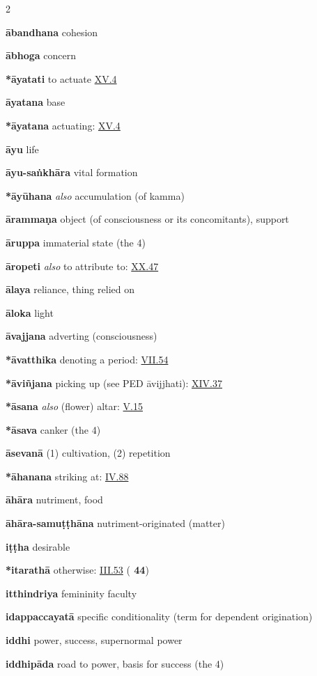 \begin{multicols}{2}
\begin{vismHanging}
\par\textbf{ābandhana} cohesion 
\par\textbf{ābhoga} concern
\par\textbf{*āyatati} to actuate \hyperlink{XV.4}{XV.4}{}
\par\textbf{āyatana} base
\par\textbf{*āyatana} actuating: \hyperlink{XV.4}{XV.4}{}
\par\textbf{āyu} life 
\par\textbf{āyu-saṅkhāra} vital formation 
\par\textbf{*āyūhana} \emph{also }accumulation (of kamma)
\par\textbf{ārammaṇa} object (of consciousness or its concomitants), support
\par\textbf{āruppa} immaterial state (the 4)
\par\textbf{āropeti} \emph{also }to attribute to: \hyperlink{XX.47}{XX.47}{}
\par\textbf{ālaya} reliance, thing relied on
\par\textbf{āloka} light 
\par\textbf{āvajjana} adverting (consciousness) 
\par\textbf{*āvatthika} denoting a period: \hyperlink{VII.54}{VII.54}{}
\par\textbf{*āviñjana} picking up (see PED āvijjhati): \hyperlink{XIV.37}{XIV.37}{} 
\par\textbf{*āsana} \emph{also }(flower) altar: \hyperlink{V.15}{V.15}{}
\par\textbf{*āsava} canker (the 4)
\par\textbf{āsevanā} (1) cultivation, (2) repetition
\par\textbf{*āhanana} striking at: \hyperlink{IV.88}{IV.88}{}
\par\textbf{āhāra} nutriment, food
\par\textbf{āhāra-samuṭṭhāna} nutriment-originated (matter) 
\par\textbf{iṭṭha} desirable
\par\textbf{*itarathā} otherwise: \hyperlink{III.53}{III.53}{} (\textbf{\cite{Dhs-a} 44})
\par\textbf{itthindriya} femininity faculty
\par\textbf{idappaccayatā} specific conditionality (term for dependent origination) 
\par\textbf{iddhi} power, success, supernormal power 
\par\textbf{iddhipāda} road to power, basis for success (the 4) 

\end{vismHanging}
\end{multicols}
